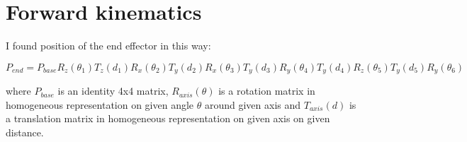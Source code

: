 \section*{Forward kinematics}

    I found position of the end effector in this way:

    $$P_{end} = P_{base} R_z(\theta_1) T_z(d_1) R_x(\theta_2) T_y(d_2) R_x(\theta_3) T_y(d_3) R_y(\theta_4) T_y(d_4) R_z(\theta_5) T_y(d_5) R_y(\theta_6)$$

    where $P_{base}$ is an identity 4x4 matrix, $R_{axis}(\theta)$ is a rotation matrix in homogeneous representation on given angle $\theta$ around given axis and $T_{axis}(d)$ is a translation matrix in homogeneous representation on given axis on given distance.
